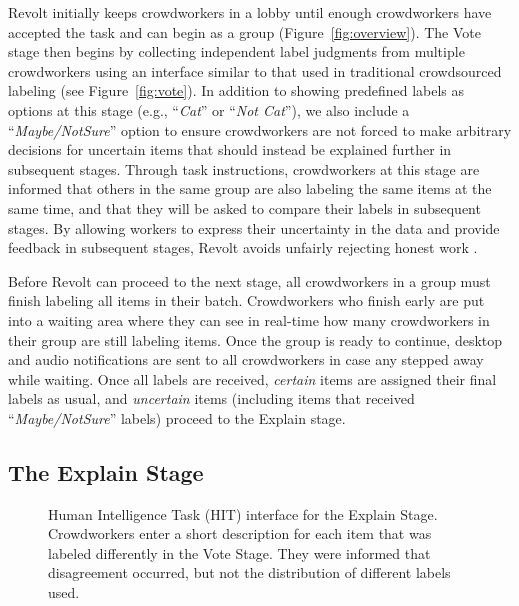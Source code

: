 Revolt initially keeps crowdworkers in a lobby until enough crowdworkers have accepted the task and can begin as a group (Figure~\ref{fig:overview}). The Vote stage then begins by collecting independent label judgments from multiple crowdworkers using an interface similar to that used in traditional crowdsourced labeling (see Figure~\ref{fig:vote}). In addition to showing predefined labels as options at this stage (e.g., ``\emph{Cat}'' or ``\emph{Not Cat}''), we also include a ``\emph{Maybe/NotSure}'' option to ensure crowdworkers are not forced to make arbitrary decisions for uncertain items that should instead be explained further in subsequent stages. Through task instructions, crowdworkers at this stage are informed that others in the same group are also labeling the same items at the same time, and that they will be asked to compare their labels in subsequent stages. By allowing workers to express their uncertainty in the data and provide feedback in subsequent stages, Revolt avoids unfairly rejecting honest work \cite{mcinnis2016taking}.

Before Revolt can proceed to the next stage, all crowdworkers in a group must finish labeling all items in their batch. Crowdworkers who finish early are put into a waiting area where they can see in real-time how many crowdworkers in their group are still labeling items. Once the group is ready to continue, desktop and audio notifications are sent to all crowdworkers in case any stepped away while waiting. Once all labels are received, \emph{certain} items are assigned their final labels as usual, and \emph{uncertain} items (including items that received ``\emph{Maybe/NotSure}'' labels) proceed to the Explain stage.


\subsection{The Explain Stage}

\begin{figure}[ht]
	\centering
	\caption[HIT interface for the Explain Stage of Revolt]{
	Human Intelligence Task (HIT) interface for the Explain Stage. Crowdworkers enter a short description for each item that was labeled differently in the Vote Stage. They were informed that disagreement occurred, but not the distribution of different labels used. 
	}
	\label{fig:explain}
\end{figure}


